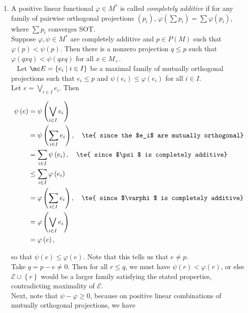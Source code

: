 \documentclass[a4paper,10pt]{report}
\begin{document}
\begin{enumerate}
\begin{proof}
  This means that there is a partial isometry $u$ with $u^*u=1$ and $uu^*=p$, so that $1=u^*(uu^*)u$ is conjugate to $p$ in $M$. If $I\subseteq M$ is a non-zero two-sided ideal, then by a previous application of the spectral theorem, %
		there is a non-zero projection $p\in I$, and consequently, $1\in I$ and $I=M$.
		
		\end{proof}
 \item 
A positive linear functional $\varphi \in M^*$ is called \textit{completely additive} if for any family of pairwise orthogonal projections $\left( p_i \right)$, $\varphi \left( \sum p_i \right) = \sum \varphi \left( p_i \right)$, where $\sum p_i$ converges SOT.\\
Suppose $\varphi , \psi \in M^*$ are completely additive and $p \in P \left( M \right)$ such that $\varphi \left( p \right) < \psi \left( p \right)$.  Then there is a nonzero projection $q \leq p$ such that $\varphi \left( q x q \right) < \psi \left( q x q \right)$ for all $x \in M_+$.\\\
\proof
Let $\mc E = \left\{ e_i \mid i \in I \right\}$ be a maximal family of mutually orthogonal projections such that $e_i \leq p$ and $\psi \left( e_i \right) \leq \varphi \left( e_i \right)$ for all $i \in I$.\\
Let $e = \bigvee_{i \in I} e_i$.  Then

\begin{align*}
  \psi \left( e \right)%
  &= \psi \left( \bigvee_{i \in I} e_i \right)\\
  &= \psi \left( \sum_{i \in I} e_i \right), \quad \te{ since the $e_i$ are mutually orthogonal}\\
  &= \sum_{i \in I} \psi \left( e_i \right), \quad \te{ since $\psi$ is completely additive}\\
  &\leq \sum_{i \in I} \varphi \left( e_i \right)\\
  &= \varphi \left( \sum_{i \in I} e_i \right), \quad \te{ since $\varphi$ is completely additive}\\
  &= \varphi \left( \bigvee_{i \in I} e_i \right)\\
  &= \varphi \left( e \right),
\end{align*}

so that $\psi \left( e \right) \leq \varphi \left( e \right)$.  Note that this tells us that $e \neq p$.\\
Take $q = p - e \neq 0$.  Then for all $r \leq q$, we must have $\psi \left( r \right) < \varphi \left( r \right)$, or else $\mathcal E \cup \left\{ r \right\}$ would be a larger family satisfying the stated properties, contradicting maximality of $\mathcal E$.\\
Next, note that $\psi - \varphi \geq 0$, because on positive linear combinations of mutually orthogonal projections, we have


\end{enumerate}
\end{document}

